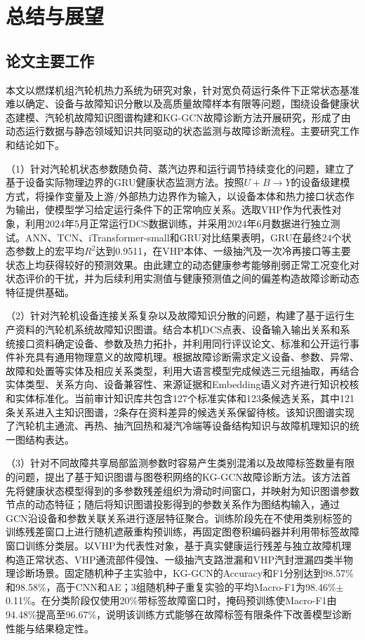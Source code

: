 \section{总结与展望}
\label{sec:conclusion_v2}

\subsection{论文主要工作}

本文以燃煤机组汽轮机热力系统为研究对象，针对宽负荷运行条件下正常状态基准难以确定、设备与故障知识分散以及高质量故障样本有限等问题，围绕设备健康状态建模、汽轮机故障知识图谱构建和KG-GCN故障诊断方法开展研究，形成了由动态运行数据与静态领域知识共同驱动的状态监测与故障诊断流程。主要研究工作和结论如下。

（1）针对汽轮机状态参数随负荷、蒸汽边界和运行调节持续变化的问题，建立了基于设备实际物理边界的GRU健康状态监测方法。按照$U+B\rightarrow Y$的设备级建模方式，将操作变量及上游/外部热力边界作为输入，以设备本体和热力接口状态作为输出，使模型学习给定运行条件下的正常响应关系。选取VHP作为代表性对象，利用2024年5月正常运行DCS数据训练，并采用2024年6月数据进行独立测试。ANN、TCN、iTransformer-small和GRU对比结果表明，GRU在最终24个状态参数上的宏平均$R^2$达到0.9511，在VHP本体、一级抽汽及一次冷再接口等主要状态上均获得较好的预测效果。由此建立的动态健康参考能够削弱正常工况变化对状态评价的干扰，并为后续利用实测值与健康预测值之间的偏差构造故障诊断动态特征提供基础。

（2）针对汽轮机设备连接关系复杂以及故障知识分散的问题，构建了基于运行生产资料的汽轮机系统故障知识图谱。结合本机DCS点表、设备输入输出关系和系统接口资料确定设备、参数及热力拓扑，并利用同行评议论文、标准和公开运行事件补充具有通用物理意义的故障机理。根据故障诊断需求定义设备、参数、异常、故障和处置等实体及相应关系类型，利用大语言模型完成候选三元组抽取，再结合实体类型、关系方向、设备兼容性、来源证据和Embedding语义对齐进行知识校核和实体标准化。当前审计知识库共包含127个标准实体和123条候选关系，其中121条关系进入主知识图谱，2条存在资料差异的候选关系保留待核。该知识图谱实现了汽轮机主通流、再热、抽汽回热和凝汽冷端等设备结构知识与故障机理知识的统一图结构表达。

（3）针对不同故障共享局部监测参数时容易产生类别混淆以及故障标签数量有限的问题，提出了基于知识图谱与图卷积网络的KG-GCN故障诊断方法。该方法首先将健康状态模型得到的多参数残差组织为滑动时间窗口，并映射为知识图谱参数节点的动态特征；随后将知识图谱投影得到的参数关系作为图结构输入，通过GCN沿设备和参数关联关系进行逐层特征聚合。训练阶段先在不使用类别标签的训练残差窗口上进行随机遮蔽重构预训练，再固定图卷积编码器并利用带标签故障窗口训练分类层。以VHP为代表性对象，基于真实健康运行残差与独立故障机理构造正常状态、VHP通流部件侵蚀、一级抽汽支路泄漏和VHP汽封泄漏四类半物理诊断场景。固定随机种子主实验中，KG-GCN的Accuracy和F1分别达到98.57\%和98.58\%，高于CNN和AE；3组随机种子重复实验的平均Macro-F1为98.46\%$\pm$0.11\%。在分类阶段仅使用20\%带标签故障窗口时，掩码预训练使Macro-F1由94.48\%提高至96.67\%，说明该训练方式能够在故障标签有限条件下改善模型诊断性能与结果稳定性。

